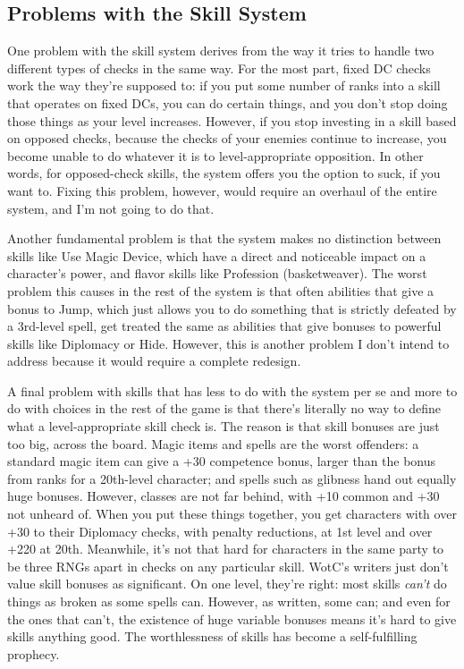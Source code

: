 \subsection{Problems with the Skill System} \label{article:skillproblems}


One problem with the skill system derives from the way it tries to handle two different types of checks in the same way. For the most part, fixed DC checks work the way they're supposed to: if you put some number of ranks into a skill that operates on fixed DCs, you can do certain things, and you don't stop doing those things as your level increases. However, if you stop investing in a skill based on opposed checks, because the checks of your enemies continue to increase, you become unable to do whatever it is to level-appropriate opposition. In other words, for opposed-check skills, the system offers you the option to suck, if you want to. Fixing this problem, however, would require an overhaul of the entire system, and I'm not going to do that.

Another fundamental problem is that the system makes no distinction between skills like Use Magic Device, which have a direct and noticeable impact on a character's power, and flavor skills like Profession (basketweaver). The worst problem this causes in the rest of the system is that often abilities that give a bonus to Jump, which just allows you to do something that is strictly defeated by a 3rd-level spell, get treated the same as abilities that give bonuses to powerful skills like Diplomacy or Hide. However, this is another problem I don't intend to address because it would require a complete redesign.

A final problem with skills that has less to do with the system per se and more to do with choices in the rest of the game is that there's literally no way to define what a level-appropriate skill check is. The reason is that skill bonuses are just too big, across the board. Magic items and spells are the worst offenders: a standard magic item can give a +30 competence bonus, larger than the bonus from ranks for a 20th-level character; and spells such as glibness hand out equally huge bonuses. However, classes are not far behind, with +10 common and +30 not unheard of. When you put these things together, you get characters with over +30 to their Diplomacy checks, with penalty reductions, at 1st level and over +220 at 20th. Meanwhile, it's not that hard for characters in the same party to be three RNGs apart in checks on any particular skill. WotC's writers just don't value skill bonuses as significant. On one level, they're right: most skills \textit{can't} do things as broken as some spells can. However, as written, some can; and even for the ones that can't, the existence of huge variable bonuses means it's hard to give skills anything good. The worthlessness of skills has become a self-fulfilling prophecy.

